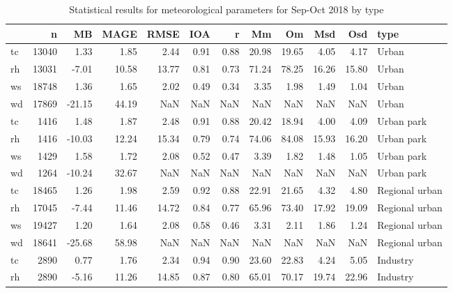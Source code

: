 \begin{table}
\centering
\caption{Statistical results for meteorological parameters for Sep-Oct 2018 by type}
\label{tab:stats_all_type}
\begin{tabular}{lrrrrrrrrrrl}
\toprule
{} &      n &     MB &   MAGE &   RMSE &   IOA &     r &     Mm &     Om &    Msd &    Osd &                 type \\
\midrule
tc &  13040 &   1.33 &   1.85 &   2.44 &  0.91 &  0.88 &  20.98 &  19.65 &   4.05 &   4.17 &                Urban \\
rh &  13031 &  -7.01 &  10.58 &  13.77 &  0.81 &  0.73 &  71.24 &  78.25 &  16.26 &  15.80 &                Urban \\
ws &  18748 &   1.36 &   1.65 &   2.02 &  0.49 &  0.34 &   3.35 &   1.98 &   1.49 &   1.04 &                Urban \\
wd &  17869 & -21.15 &  44.19 &    NaN &   NaN &   NaN &    NaN &    NaN &    NaN &    NaN &                Urban \\
tc &   1416 &   1.48 &   1.87 &   2.48 &  0.91 &  0.88 &  20.42 &  18.94 &   4.00 &   4.09 &           Urban park \\
rh &   1416 & -10.03 &  12.24 &  15.34 &  0.79 &  0.74 &  74.06 &  84.08 &  15.93 &  16.20 &           Urban park \\
ws &   1429 &   1.58 &   1.72 &   2.08 &  0.52 &  0.47 &   3.39 &   1.82 &   1.48 &   1.05 &           Urban park \\
wd &   1264 & -10.24 &  32.67 &    NaN &   NaN &   NaN &    NaN &    NaN &    NaN &    NaN &           Urban park \\
tc &  18465 &   1.26 &   1.98 &   2.59 &  0.92 &  0.88 &  22.91 &  21.65 &   4.32 &   4.80 &       Regional urban \\
rh &  17045 &  -7.44 &  11.46 &  14.72 &  0.84 &  0.77 &  65.96 &  73.40 &  17.92 &  19.09 &       Regional urban \\
ws &  19427 &   1.20 &   1.64 &   2.08 &  0.58 &  0.46 &   3.31 &   2.11 &   1.86 &   1.24 &       Regional urban \\
wd &  18641 & -25.68 &  58.98 &    NaN &   NaN &   NaN &    NaN &    NaN &    NaN &    NaN &       Regional urban \\
tc &   2890 &   0.77 &   1.76 &   2.34 &  0.94 &  0.90 &  23.60 &  22.83 &   4.24 &   5.05 &             Industry \\
rh &   2890 &  -5.16 &  11.26 &  14.85 &  0.87 &  0.80 &  65.01 &  70.17 &  19.74 &  22.96 &             Industry \\

\end{tabular}
\end{table}

